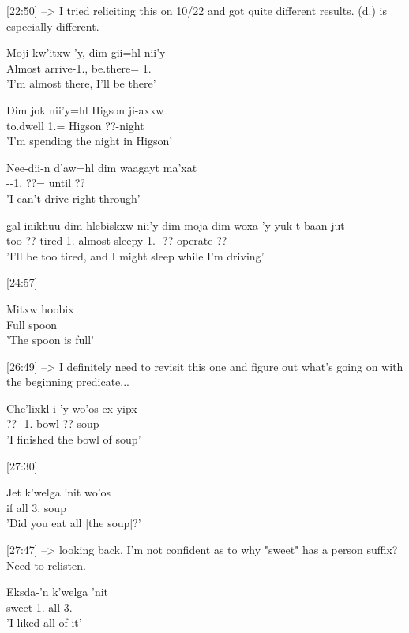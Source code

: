 [22:50] --> I tried reliciting this on 10/22 and got quite different results. (d.) is especially different.
\begin{exe}
  \ex  \begin{xlist}
\item  \gll Moji kw'itxw-'y, dim gii=hl nii'y\\
Almost arrive-1.\Ii{}, \Fut{} be.there=\Cn{} 1.\Iii{}\\
'I'm almost there, I'll be there'
\item \gll Dim jok nii'y=hl Higson ji-axxw\\
\Fut{} to.dwell 1.\Iii{}=\Cn{} Higson ??-night\\
'I'm spending the night in Higson'
\item \gll Nee-dii-n d'aw=hl dim waag̱ayt ma'xat\\
\Neg{}-\Foc{}-1.\I{} ??=\Cn{} \Fut{} until ?? \\
'I can't drive right through'
\item \gll g̱al-inikhuu dim hlebiskxw nii'y dim moja dim woxa-'y yuk-t baan-jut\\
too-?? \Fut{} tired 1.\Iii{} \Fut{} almost \Fut{} sleepy-1.\Ii{} \Prog{}-?? operate-?? \\
'I'll be too tired, and I might sleep while I'm driving'
    \end{xlist}
\end{exe}

[24:57]
\begin{exe}
\ex \gll Mitxw hoobix\\
Full spoon\\
'The spoon is full'
\end{exe}

[26:49] --> I definitely need to revisit this one and figure out what's going on with the beginning predicate...
\begin{exe}
\ex \gll Che'lixkl-i-'y wo'os ex-yipx\\
??-\Tr{}-1.\Ii{} bowl ??-soup\\
'I finished the bowl of soup'
\end{exe}

[27:30]
\begin{exe}
\ex \gll Jet k'welg̱a 'nit wo'os\\
if all 3.\Iii{} soup\\
'Did you eat all [the soup]?'
\end{exe}

[27:47] --> looking back, I'm not confident as to why "sweet" has a person suffix? Need to relisten.
\begin{exe}
\ex \gll Eksda-'n k'welg̱a 'nit\\
sweet-1.\I{} all 3.\Iii{}\\
'I liked all of it'
\end{exe}

